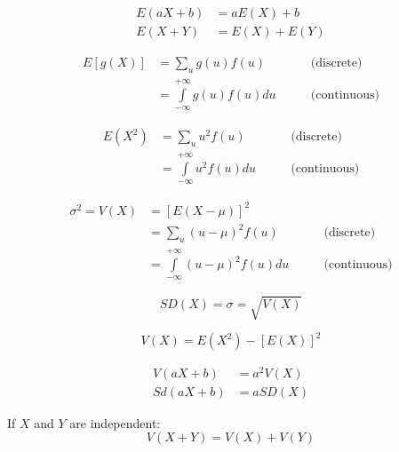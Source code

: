 \begin{multicols*}{3}
      \begin{align*}
        E(aX + b) &= aE(X) + b \\
        E(X + Y)  &= E(X) + E(Y)
      \end{align*}

      \begin{align*}
        E[g(X)] &= \sum\limits_{u} g(u) f(u) & \qquad \text{(discrete)}\\
                &= \int\limits_{-\infty}^{+\infty} g(u) f(u) du & \qquad \text{(continuous)}
      \end{align*}

      \begin{align*}
        E(X^2) &= \sum\limits_{u} u^2 f(u) & \qquad \text{(discrete)}\\
             &= \int\limits_{-\infty}^{+\infty} u^2 f(u)du & \qquad \text{(continuous)}
      \end{align*}

      \begin{align*}
        \sigma^2 = V(X) &= [E(X - \mu)]^2 \\
                        &= \sum\limits_{u} (u - \mu)^2 f(u) & \qquad \text{(discrete)}\\
                        &= \int\limits_{-\infty}^{+\infty} (u - \mu)^2 f(u)du & \qquad \text{(continuous)}
      \end{align*}

    \[
        SD(X) = \sigma = \sqrt{V(X)}
    \]

      \[
        V(X) = E(X^2) - [E(X)]^2
      \]

      \begin{align*}
        V(aX + b) &= a^2 V(X) \\
        Sd(aX + b) &= a SD(X)
      \end{align*}

      \par If $X$ and $Y$ are independent:
      \[
        V(X + Y) = V(X) + V(Y)
      \]

\end{multicols*}
